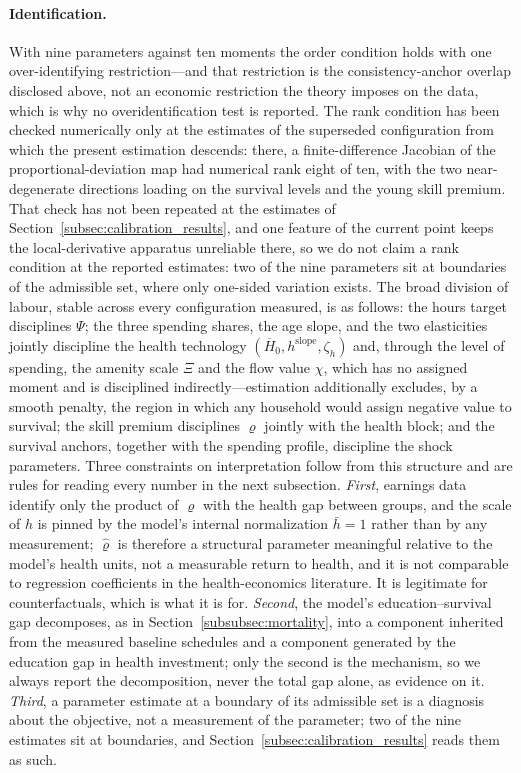 \documentclass[12pt,a4paper]{article}
\begin{document}
\paragraph{Identification.} With nine parameters against ten moments the order condition holds with one over-identifying restriction---and that restriction is the consistency-anchor overlap disclosed above, not an economic restriction the theory imposes on the data, which is why no overidentification test is reported. The rank condition has been checked numerically only at the estimates of the superseded configuration from which the present estimation descends: there, a finite-difference Jacobian of the proportional-deviation map had numerical rank eight of ten, with the two near-degenerate directions loading on the survival levels and the young skill premium. That check has not been repeated at the estimates of Section~\ref{subsec:calibration_results}, and one feature of the current point keeps the local-derivative apparatus unreliable there, so we do not claim a rank condition at the reported estimates: two of the nine parameters sit at boundaries of the admissible set, where only one-sided variation exists. The broad division of labour, stable across every configuration measured, is as follows: the hours target disciplines $\Psi$; the three spending shares, the age slope, and the two elasticities jointly discipline the health technology $(\overline{H}_0, h^{\mathrm{slope}}, \zeta_h)$ and, through the level of spending, the amenity scale $\Xi$ and the flow value $\chi$, which has no assigned moment and is disciplined indirectly---estimation additionally excludes, by a smooth penalty, the region in which any household would assign negative value to survival; the skill premium disciplines $\varrho$ jointly with the health block; and the survival anchors, together with the spending profile, discipline the shock parameters. Three constraints on interpretation follow from this structure and are rules for reading every number in the next subsection. \emph{First}, earnings data identify only the product of $\varrho$ with the health gap between groups, and the scale of $h$ is pinned by the model's internal normalization $\bar h = 1$ rather than by any measurement; $\widehat\varrho$ is therefore a structural parameter meaningful relative to the model's health units, not a measurable return to health, and it is not comparable to regression coefficients in the health-economics literature. It is legitimate for counterfactuals, which is what it is for. \emph{Second}, the model's education--survival gap decomposes, as in Section~\ref{subsubsec:mortality}, into a component inherited from the measured baseline schedules and a component generated by the education gap in health investment; only the second is the mechanism, so we always report the decomposition, never the total gap alone, as evidence on it. \emph{Third}, a parameter estimate at a boundary of its admissible set is a diagnosis about the objective, not a measurement of the parameter; two of the nine estimates sit at boundaries, and Section~\ref{subsec:calibration_results} reads them as such.
\end{document}
